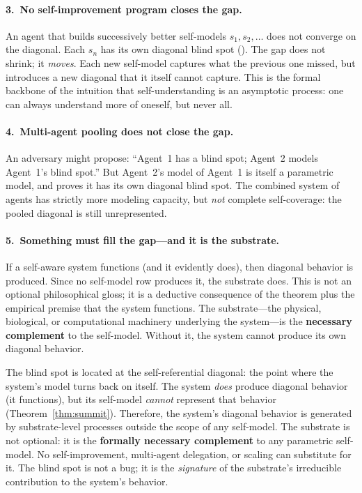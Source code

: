 \documentclass[11pt]{article}
\begin{document}
\paragraph{3.\ No self-improvement program closes the gap.}
An agent that builds successively better self-models $s_1, s_2,
\ldots$ does not converge on the diagonal.  Each $s_n$ has its own
diagonal blind spot
().  The gap
does not shrink; it \emph{moves}.  Each new self-model captures
what the previous one missed, but introduces a new diagonal that
it itself cannot capture.  This is the formal backbone of the
intuition that self-understanding is an asymptotic process: one
can always understand more of oneself, but never all.

\paragraph{4.\ Multi-agent pooling does not close the gap.}
An adversary might propose: ``Agent~1 has a blind spot; Agent~2
models Agent~1's blind spot.''  But Agent~2's model of Agent~1 is
itself a parametric model, and
 proves it has its
own diagonal blind spot.  The combined system of agents has
strictly more modeling capacity, but \emph{not} complete
self-coverage: the pooled diagonal is still unrepresented.

\paragraph{5.\ Something must fill the gap---and it is the substrate.}
If a self-aware system functions (and it evidently does), then
diagonal behavior is produced.  Since no self-model row produces
it, the substrate does.  This is not an optional philosophical
gloss; it is a deductive consequence of the theorem plus the
empirical premise that the system functions.  The substrate---the
physical, biological, or computational machinery underlying the
system---is the \textbf{necessary complement} to the self-model.
Without it, the system cannot produce its own diagonal behavior.

\begin{keybox}[title={What fills the blind spot}]
The blind spot is located at the self-referential diagonal: the
point where the system's model turns back on itself.  The system
\emph{does} produce diagonal behavior (it functions), but its
self-model \emph{cannot} represent that behavior
(Theorem~\ref{thm:summit}).  Therefore, the system's diagonal
behavior is generated by substrate-level processes outside the
scope of any self-model.  The substrate is not optional: it is the
\textbf{formally necessary complement} to any parametric
self-model.  No self-improvement, multi-agent delegation, or
scaling can substitute for it.  The blind spot is not a bug; it is
the \emph{signature} of the substrate's irreducible contribution
to the system's behavior.
\end{keybox}
\end{document}
